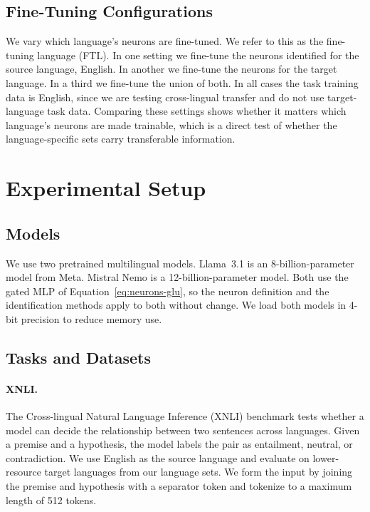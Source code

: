 \subsection{Fine-Tuning Configurations}
\label{subsec:neurons-config}

We vary which language's neurons are fine-tuned. We refer to this as the
fine-tuning language (FTL). In one setting we fine-tune the neurons identified for
the source language, English. In another we fine-tune the neurons for the target
language. In a third we fine-tune the union of both. In all cases the task training
data is English, since we are testing cross-lingual transfer and do not use
target-language task data. Comparing these settings shows whether it matters which
language's neurons are made trainable, which is a direct test of whether the
language-specific sets carry transferable information.

\section{Experimental Setup}
\label{sec:neurons-setup}

\subsection{Models}
\label{subsec:neurons-models}

We use two pretrained multilingual models. Llama~3.1 \citep{grattafiori2024llama}
is an 8-billion-parameter model from Meta. Mistral Nemo \citep{mistral2024nemo} is
a 12-billion-parameter model. Both use the gated MLP of
Equation~\ref{eq:neurons-glu}, so the neuron definition and the identification
methods apply to both without change. We load both models in 4-bit precision to
reduce memory use.

\subsection{Tasks and Datasets}
\label{subsec:neurons-tasks}

\paragraph{XNLI.}
The Cross-lingual Natural Language Inference (XNLI) benchmark
\citep{conneau2018xnli} tests whether a model can decide the relationship between
two sentences across languages. Given a premise and a hypothesis, the model labels
the pair as entailment, neutral, or contradiction. We use English as the source
language and evaluate on lower-resource target languages from our language sets. We
form the input by joining the premise and hypothesis with a separator token and
tokenize to a maximum length of 512 tokens.

